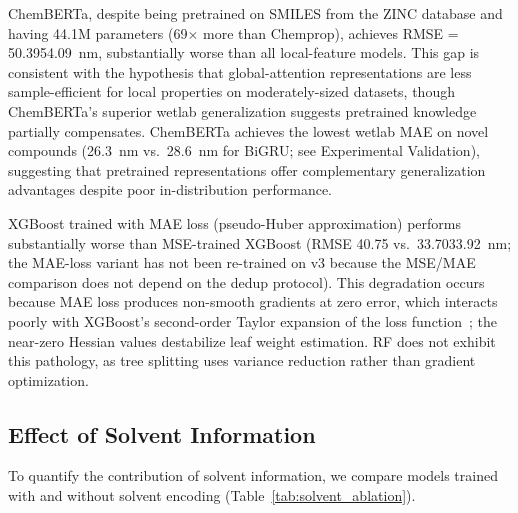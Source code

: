 \documentclass[journal=jcisd8,manuscript=article]{achemso}
\newcommand{\added}[1]{{\color{addedblue}#1}}
\newcommand{\removed}[1]{{\color{removedred}#1}}
\begin{document}
ChemBERTa, despite being pretrained on SMILES from the ZINC database and having 44.1M parameters (69$\times$ more than Chemprop), achieves RMSE = \removed{50.39}\added{54.09}~nm, substantially worse than all local-feature models.
This gap is consistent with the hypothesis that global-attention representations are less sample-efficient for local properties on moderately-sized datasets, though ChemBERTa's superior wetlab generalization suggests pretrained knowledge partially compensates.
ChemBERTa achieves the lowest wetlab MAE on novel compounds (26.3~nm vs.\ 28.6~nm for BiGRU; see Experimental Validation), suggesting that pretrained representations offer complementary generalization advantages despite poor in-distribution performance.

XGBoost trained with MAE loss (pseudo-Huber approximation) performs substantially worse than MSE-trained XGBoost (RMSE 40.75 vs.\ \removed{33.70}\added{33.92}~nm\added{; the MAE-loss variant has not been re-trained on v3 because the MSE/MAE comparison does not depend on the dedup protocol}).
This degradation occurs because MAE loss produces non-smooth gradients at zero error, which interacts poorly with XGBoost's second-order Taylor expansion of the loss function~\cite{chen2016xgboost}; the near-zero Hessian values destabilize leaf weight estimation.
RF does not exhibit this pathology, as tree splitting uses variance reduction rather than gradient optimization.


\subsection{Effect of Solvent Information}
\label{sec:solvent_ablation}

To quantify the contribution of solvent information, we compare models trained with and without solvent encoding (Table~\ref{tab:solvent_ablation}).
\end{document}
